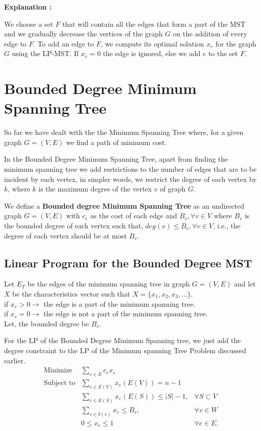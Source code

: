 \documentclass[12pt]{article}
\theoremstyle{plain}
\begin{document}
\textbf{Explanation :}

We choose a set $F$ that will contain all the edges that form a part of the MST and we gradually decrease the vertices of the graph $G$ on the addition of every edge to $F$. To add an edge to $F$, we compute its optimal solution $x_e$ for the graph $G$ using the LP-MST. If $x_e =0$ the edge is ignored, else we add $e$ to the set $F$. 

\section*{Bounded Degree Minimum Spanning Tree}
So far we have dealt with the the Minimum Spanning Tree where, for a given graph $G=(V,E)$ we find a path of minimum cost.

In the Bounded Degree Minimum Spanning Tree, apart from finding the minimum spanning tree we add restrictions to the number of edges that are to be incident by each vertex, in simpler words, we restrict the degree of each vertex by $k$, where $k$ is the maximum degree of the vertex $v$ of graph $G$.

We define a \textbf{Bounded degree Minimum Spanning Tree} as an undirected graph $G=(V,E)$ with $c_e$ as the cost of each edge and $B_v, \forall v \in V$ where $B_v$ is the bounded degree of each vertex such that, $ deg(v) \leq B_v,  \forall v \in V$, i.e., the degree of each vertex should be at most $B_v$.

\subsection*{Linear Program for the Bounded Degree MST} \cite{lp-bdmst}

Let $E_T$ be the edges of the minimum spanning tree in graph $G=(V,E)$ and let $X$ be the characteristics vector such that $X=\{ x_1,x_2,x_3,\ldots\}$.\\
if ${x_e > 0 \rightarrow}$ the edge is a part of the minimum spanning tree. \\
if ${x_e= 0 \rightarrow}$ the edge is not a part of the minimum spanning tree.\\
Let, the bounded degree be $B_v$.

For the LP of the Bounded Degree Minimum Spanning tree, we just add the degree constraint to the LP of the Minimum spanning Tree Problem discussed earlier.\\  
 \begin{align}
\mbox{Minimize} &  \sum_{e \in E} c_e x_e & \nonumber \\
\mbox{Subject to} &\sum_{e \in E(V)}  x_e(E(V)) = n-1 \\
&\sum_{e\in E(S)}  x_e(E(S)) \leq |S|-1, & \forall S \subset V \\ 
&\sum _{e \in \delta (v)} x_e \leq B_v, & \forall v \in W \\
& 0 \leq x_e \leq 1 & \forall e \in E.
 \end{align}
\end{document}
